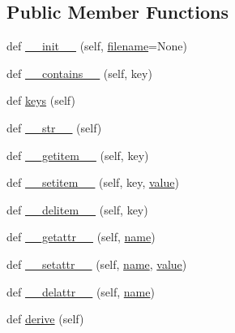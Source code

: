 \subsection*{Public Member Functions}
\begin{DoxyCompactItemize}
\item 
def \hyperlink{classwaflib_1_1_config_set_1_1_config_set_a9592d030b3ece10a3cc85e76c6d4d586}{\+\_\+\+\_\+init\+\_\+\+\_\+} (self, \hyperlink{test__portburn_8cpp_a7efa5e9c7494c7d4586359300221aa5d}{filename}=None)
\item 
def \hyperlink{classwaflib_1_1_config_set_1_1_config_set_ad599ed7bbada48771389b986e42137d6}{\+\_\+\+\_\+contains\+\_\+\+\_\+} (self, key)
\item 
def \hyperlink{classwaflib_1_1_config_set_1_1_config_set_a73dc4acb24e0408d47bb9604ab429fbe}{keys} (self)
\item 
def \hyperlink{classwaflib_1_1_config_set_1_1_config_set_a3fafb555a7809f22f984eee5913cbfb8}{\+\_\+\+\_\+str\+\_\+\+\_\+} (self)
\item 
def \hyperlink{classwaflib_1_1_config_set_1_1_config_set_ae40a3d8f76c4c27bd9b30c250864db89}{\+\_\+\+\_\+getitem\+\_\+\+\_\+} (self, key)
\item 
def \hyperlink{classwaflib_1_1_config_set_1_1_config_set_ab82cb47b02cc0ce0d6e3720952b67539}{\+\_\+\+\_\+setitem\+\_\+\+\_\+} (self, key, \hyperlink{lib_2expat_8h_a4a30a13b813682e68c5b689b45c65971}{value})
\item 
def \hyperlink{classwaflib_1_1_config_set_1_1_config_set_afd42b2bd844bf848aecda7834df7248c}{\+\_\+\+\_\+delitem\+\_\+\+\_\+} (self, key)
\item 
def \hyperlink{classwaflib_1_1_config_set_1_1_config_set_a33d1dd66cb886ad8a13fa264c13963bf}{\+\_\+\+\_\+getattr\+\_\+\+\_\+} (self, \hyperlink{lib_2expat_8h_a1b49b495b59f9e73205b69ad1a2965b0}{name})
\item 
def \hyperlink{classwaflib_1_1_config_set_1_1_config_set_a596c7bd3418e98f61f95ee7f45db4ef0}{\+\_\+\+\_\+setattr\+\_\+\+\_\+} (self, \hyperlink{lib_2expat_8h_a1b49b495b59f9e73205b69ad1a2965b0}{name}, \hyperlink{lib_2expat_8h_a4a30a13b813682e68c5b689b45c65971}{value})
\item 
def \hyperlink{classwaflib_1_1_config_set_1_1_config_set_a260c35fb06416f728dad93a70e4f78e7}{\+\_\+\+\_\+delattr\+\_\+\+\_\+} (self, \hyperlink{lib_2expat_8h_a1b49b495b59f9e73205b69ad1a2965b0}{name})
\item 
def \hyperlink{classwaflib_1_1_config_set_1_1_config_set_a994b841a806d866d74ee92e66b4741d2}{derive} (self)

\end{DoxyCompactItemize}
